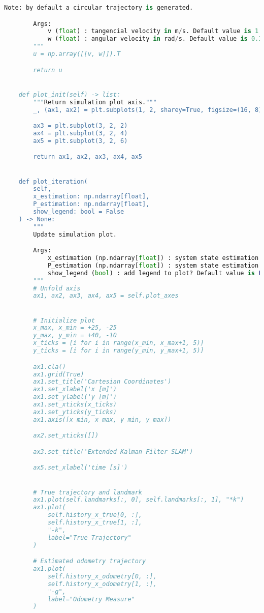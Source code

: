 \documentclass[../CSC_5RO12_TA_TP4.tex]{subfiles}
\begin{document}
\begin{scriptsize}
\begin{lstlisting}[language=Python]
        Note: by default a circular trajectory is generated.

        Args:
            v (float) : tangencial velocity in m/s. Default value is 1.0 m/s.
            w (float) : angular velocity in rad/s. Default value is 0.1 rad/s.
        """
        u = np.array([[v, w]]).T

        return u


    def plot_init(self) -> list:
        """Return simulation plot axis."""
        _, (ax1, ax2) = plt.subplots(1, 2, sharey=True, figsize=(16, 8))

        ax3 = plt.subplot(3, 2, 2)
        ax4 = plt.subplot(3, 2, 4)
        ax5 = plt.subplot(3, 2, 6)

        return ax1, ax2, ax3, ax4, ax5


    def plot_iteration(
        self,
        x_estimation: np.ndarray[float],
        P_estimation: np.ndarray[float],
        show_legend: bool = False
    ) -> None:
        """
        Update simulation plot.

        Args:
            x_estimation (np.ndarray[float]) : system state estimation at instant k.
            P_estimation (np.ndarray[float]) : system state estimation covariance at instant k.
            show_legend (bool) : add legend to plot? Default value is False.
        """
        # Unfold axis
        ax1, ax2, ax3, ax4, ax5 = self.plot_axes


        # Initialize plot
        x_max, x_min = +25, -25
        y_max, y_min = +40, -10
        x_ticks = [i for i in range(x_min, x_max+1, 5)]
        y_ticks = [i for i in range(y_min, y_max+1, 5)]

        ax1.cla()
        ax1.grid(True)
        ax1.set_title('Cartesian Coordinates')
        ax1.set_xlabel('x [m]')
        ax1.set_ylabel('y [m]')
        ax1.set_xticks(x_ticks)
        ax1.set_yticks(y_ticks)
        ax1.axis([x_min, x_max, y_min, y_max])

        ax2.set_xticks([])

        ax3.set_title('Extended Kalman Filter SLAM')

        ax5.set_xlabel('time [s]')


        # True trajectory and landmark
        ax1.plot(self.landmarks[:, 0], self.landmarks[:, 1], "*k")
        ax1.plot(
            self.history_x_true[0, :],
            self.history_x_true[1, :],
            "-k",
            label="True Trajectory"
        )

        # Estimated odometry trajectory
        ax1.plot(
            self.history_x_odometry[0, :],
            self.history_x_odometry[1, :],
            "-g",
            label="Odometry Measure"
        )


\end{lstlisting}
\end{scriptsize}
\end{document}
